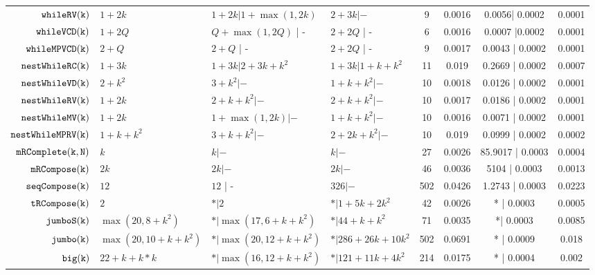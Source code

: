 {\begin {table}[H]
\begin{center}
{\begin{tabular}{ r | l | l | l | c | c | c | c  }
         $  \mathtt{whileRV(k)}$ & $1 + 2k$ &  $1 + 2k| 1 + \max(1,2k)$ & $2 + 3 k| -$  &  9 & 0.0016 & 0.0056| 0.0002 & 0.0001  \\
         $  {\mathtt{whileVCD(k)}} $ & ${1 + 2Q}$ &  ${Q+\max(1,2Q)}$ | - & $2+2Q$ | -  &  6 & 0.0016 & 0.0007 |0.0002 & 0.0001 \\
         $ {\mathtt{whileMPVCD(k)}}$ & $2+Q$ &  $2 + Q$ | - & $2+2Q$ | -  &   9 & 0.0017 & 0.0043 | 0.0002 & 0.0001 \\
         $  \mathtt{nestWhileRC(k)}$ & $1 + 3k$ &  $1 + 3k | 2 + 3k + k^2$ &  $1 + 3k | 1 + k + k^2$  &  11 & 0.019 & 0.2669 | 0.0002 & 0.0007 \\
         $  \mathtt{nestWhileVD(k)}$ & $2 + k^2$ &   $3 + k^2| -$ & $1 + k + k^2|- $   &  10 & 0.0018 & 0.0126 | 0.0002 & 0.0001  \\
         $  \mathtt{nestWhileRV(k)}$ & $1 + 2k$ &  
         $ 2 + k +  k^2 | -$ 
         &  $2 + k + k^2| -$   &  10 & 0.0017 & 0.0186 | 0.0002 & 0.0001  \\
         $  \mathtt{nestWhileMV(k)}$ & $1 + 2k $ & $1 + \max(1,2k) | -$ &  $1 + k + k^2 |-$  & 10 & 0.0016 & 0.0071 | 0.0002 & 0.0001 \\
         $  \mathtt{nestWhileMPRV(k)}$ & $1 + k + k^2$ &  $3 + k + k^2  | -$ &  $2 + 2k + k^2 | - $  &  10 & 0.019 & 0.0999 | 0.0002 & 0.0002 \\
         $  \mathtt{mRComplete(k, N)}$ & $k$ & $ k | -  $ & $k |-$   &  27 & 0.0026 & 85.9017 | 0.0003 & 0.0004 \\
        $  \mathtt{mRCompose(k)}$ & $2k$ & $  2k | -$ & $ 2k | -$   &  46 & 0.0036 & 5104 | 0.0003 &  0.0013\\
         $  \mathtt{seqCompose(k)}$ & $12$ & $12  $ | - & $326 | -$  &  502 & 0.0426  & 1.2743 | 0.0003 & 0.0223 \\
         $  \mathtt{tRCompose(k)}$ & $2$ &  $ * | 2$ & $* | 1 + 5k + 2 k^2 $  &  42 & 0.0026 & * | 0.0003 & 0.0005\\
         $  \mathtt{{jumboS(k)}}$ & $ \max(20, 8+k^2)$ &  $ * | \max(17, 6+k+k^2)$   &   $* | {44+k+k^2} $  &  71 & 0.0035 & *| 0.0003 &  0.0085 \\
         $  \mathtt{jumbo(k)}$ & $ \max(20, 10+k+k^2 )$ &   $* | \max(20, 12 + k+ k^2)$  &  $* |286+26k+10k^2$   &  502 & 0.0691 & * | 0.0009 & 0.018 \\
         $  {\mathtt{big(k)}} $ & $22+k+k*k$ &  $* |\max(16, 12 + k + k^2 )$ &  $* |121+11k+4k^2 $  &  214 & 0.0175 & * | 0.0004 & 0.002 
        \end{tabular}
}
\end{center}
\end{table}
}